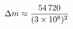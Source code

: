\documentclass[preview]{standalone}
\begin{document}
\begin{align*}
\special{dvisvgm:raw <g id='unique000'>}\Delta m \approx \frac{54\,720}{(3\times10^8)^2}\special{dvisvgm:raw </g>}
\end{align*}
\end{document}
